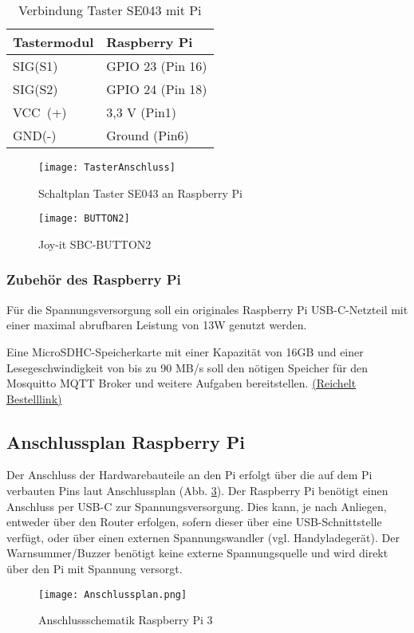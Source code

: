 \begin{table}[H]
	\centering
	\begin{tabular}{|p{5cm}|p{5cm}|} 
		\hline
		Tastermodul & Raspberry Pi\\ 
		\hline
		SIG(S1)                   & GPIO 23 \hspace{0,3cm}(Pin 16)\\
		\hline
		SIG(S2)                   & GPIO 24 \hspace{0,3cm}(Pin 18)\\
		\hline
		VCC~(+)   & 3,3 V \hspace{1cm}(Pin\hspace{0,35cm}1)\\ 
		\hline
		GND(-)                   & Ground \hspace{0,6cm}(Pin\hspace{0,35cm}6)\\
		\hline
		
\end{tabular}
	\caption{Verbindung Taster SE043 mit Pi}
	\label{TasterTabelle}
\end{table}

	\begin{figure}[H]
	\centering
	\texttt{[image: TasterAnschluss]}
	\caption{Schaltplan Taster SE043 an Raspberry Pi}
	\label{TasterAnschluss}
	\end{figure}

	\begin{figure}[h] %
	\centering
	\texttt{[image: BUTTON2]}
	\caption{Joy-it SBC-BUTTON2 \cite{reicheltelektronikGmbH&amp.21.04.2022b}}
	\label{BUTTON2}
	\end{figure}

\subsubsection{Zubehör des Raspberry Pi}
Für die Spannungsversorgung soll ein originales Raspberry Pi USB-C-Netzteil mit einer maximal abrufbaren Leistung von 13W genutzt werden.\par

Eine MicroSDHC-Speicherkarte mit einer Kapazität von 16GB und einer Lesegeschwindigkeit von bis zu 90 MB/s soll den nötigen Speicher für den Mosquitto MQTT Broker und weitere Aufgaben bereitstellen. \href{\linkmicrosd}{(Reichelt Bestelllink)} 

\newpage

\subsection{Anschlussplan Raspberry Pi}
Der Anschluss der Hardwarebauteile an den Pi erfolgt über die auf dem Pi verbauten Pins laut Anschlussplan (Abb. \ref{Anschlussplan}). Der Raspberry Pi benötigt einen Anschluss per USB-C zur Spannungsversorgung. Dies kann, je nach Anliegen, entweder über den Router erfolgen, sofern dieser über eine USB-Schnittstelle verfügt, oder über einen externen Spannungswandler (vgl. Handyladegerät). Der Warnsummer/Buzzer benötigt keine externe Spannungsquelle und wird direkt über den Pi mit Spannung versorgt.

\begin{figure}[H]	%
\begin{center}
\texttt{[image: Anschlussplan.png]}
\caption{Anschlussschematik Raspberry Pi 3}
\label{Anschlussplan}
\end{center}
\end{figure}

